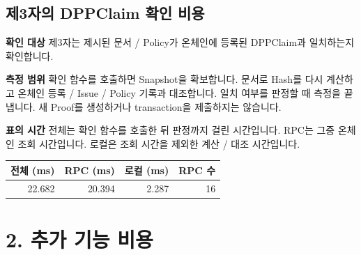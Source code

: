 \documentclass[11pt,a4paper]{article}
\begin{document}
\par\noindent\begin{minipage}{\linewidth}
\subsection*{제3자의 DPPClaim 확인 비용}
\textbf{확인 대상}\newline
제3자는 제시된 문서 / Policy가 온체인에 등록된 DPPClaim과 일치하는지 확인합니다.\par\smallskip
\textbf{측정 범위}\newline
확인 함수를 호출하면 Snapshot을 확보합니다.\newline
문서로 Hash를 다시 계산하고 온체인 등록 / Issue / Policy 기록과 대조합니다.\newline
일치 여부를 판정할 때 측정을 끝냅니다.\newline
새 Proof를 생성하거나 transaction을 제출하지는 않습니다.\par\smallskip
\textbf{표의 시간}\newline
전체는 확인 함수를 호출한 뒤 판정까지 걸린 시간입니다.\newline
RPC는 그중 온체인 조회 시간입니다.\newline
로컬은 조회 시간을 제외한 계산 / 대조 시간입니다.\par\smallskip
\begin{center}\small\begin{tabular}{@{}rrrr@{}}\toprule
\textbf{전체 (ms)} & \textbf{RPC (ms)} & \textbf{로컬 (ms)} & \textbf{RPC 수} \\
\midrule
22.682 & 20.394 & 2.287 & 16 \\
\bottomrule\end{tabular}\end{center}
\end{minipage}\par\medskip
{}\section*{2. 추가 기능 비용}
\end{document}
